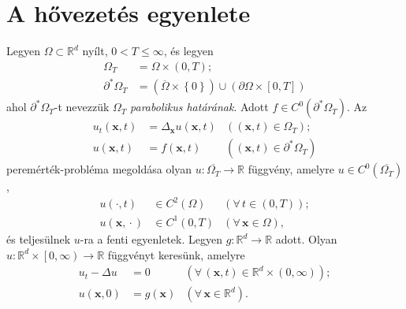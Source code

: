 \documentclass[%
	DIV=15,appendixprefix]{scrreprt}
\theoremstyle{definition}
\theoremstyle{remark}
\begin{document}
\section{A hővezetés egyenlete}
%
Legyen $ \Omega \subset \mathbb{ R }^{ d } $ nyílt, $ 0 < T \le \infty $, és legyen
\begin{align*}
	\Omega_{ T } 				&= \Omega \times \left( 0,{} T \right);\\
	\partial^{ * }\Omega_{ T } 	&= \left( \overline{ \Omega } \times \left\{ 0 \right\} \right) \cup
		\left( \partial \Omega \times \left[ 0,{} T \right] \right)
\end{align*}
ahol $ \partial^{ * }\Omega_{ T } $-t nevezzük $ \Omega_{ T } $ \emph{parabolikus határának}. Adott
$ f \in C^{ 0 } \left( \partial^{ * } \Omega_{ T } \right) $. Az
\begin{align*}
	u_{ t } \left( \mathbf{ x },{} t \right) 	&= \Delta_{ \mathbf{ x } } u \left( \mathbf{ x },{}
	t \right) 	& \left( \left( \mathbf{ x },{} t \right) \in \Omega_{ T } \right);\\
	u \left( \mathbf{ x },{} t \right) 			&= f \left( \mathbf{ x },{} t \right)
					 & \left( \left( 		\mathbf{ x },{} t \right) \in \partial^{ * }
					 \Omega_{ T } \right)
\end{align*}
peremérték-probléma megoldása olyan $ u \colon \overline{ \Omega_{ T } } \rightarrow \mathbb{ R } $
függvény, amelyre $ u \in C^{ 0 } \left( \overline{ \Omega_{ T } } \right) $,
\begin{align*}
	u \left( \cdot,{} t \right) & \in C^{ 2 } \left( \Omega \right) & \left( \forall \, t \in \left(
		0,{} T \right) \right);\\
	u \left( \mathbf{ x },{} \cdot \right) & \in C^{ 1 } \left( 0,{} T \right) & \left( \forall \,
		\mathbf{ x } \in \Omega \right),
\end{align*}
és teljesülnek $u$-ra a fenti egyenletek.
Legyen $ g \colon \mathbb{ R }^{ d } \rightarrow \mathbb{ R } $ adott. Olyan $ u \colon
\mathbb{ R }^{ d } \times \left.\left[ 0,{} \infty \right)\right. \rightarrow \mathbb{ R } $
függvényt keresünk, amelyre
\begin{align*}
	u_{ t } - \Delta u &= 0 & \left( \forall \, \left( \mathbf{ x },{} t \right) \in
		\mathbb{ R }^{ d } \times \left( 0,{} \infty \right) \right);\\
	u \left( \mathbf{ x },{} 0 \right) &= g \left( \mathbf{ x } \right) & \left( \forall \,
		\mathbf{ x } \in \mathbb{ R }^{ d } \right).
\end{align*}
\end{document}
